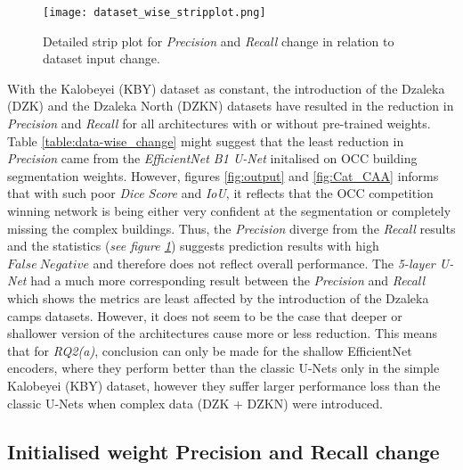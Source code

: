 \documentclass[11pt, a4paper, twoside]{report}
\begin{document}
\begin{figure}[H]
  \centering
  \texttt{[image: dataset\_wise\_stripplot.png]}
  \caption{Detailed strip plot for \textit{Precision} and \textit{Recall} change in relation to dataset input change.}
  \label{fig:data_stripplot}
\end{figure}


With the Kalobeyei (KBY) dataset as constant, the introduction of the Dzaleka (DZK) and the Dzaleka North (DZKN) datasets have resulted in the reduction in \textit{Precision} and \textit{Recall} for all architectures with or without pre-trained weights. Table \ref{table:data-wise_change} might suggest that the least reduction in \textit{Precision} came from the \textit{EfficientNet B1 U-Net} initalised on OCC building segmentation weights. However, figures \ref{fig:output} and \ref{fig:Cat_CAA} informs that with such poor \textit{Dice Score} and \textit{IoU}, it reflects that the OCC competition winning network is being either very confident at the segmentation or completely missing the complex buildings. Thus, the \textit{Precision} diverge from the \textit{Recall} results and the statistics (\textit{see figure \ref{fig:data_stripplot}}) suggests prediction results with high $False\ Negative$ and therefore does not reflect overall performance. The \textit{5-layer U-Net} had a much more corresponding result between the \textit{Precision} and \textit{Recall} which shows the metrics are least affected by the introduction of the Dzaleka camps datasets. However, it does not seem to be the case that deeper or shallower version of the architectures cause more or less reduction. This means that for \textit{RQ2(a)}, conclusion can only be made for the shallow EfficientNet encoders, where they perform better than the classic U-Nets only in the simple Kalobeyei (KBY) dataset, however they suffer larger performance loss than the classic U-Nets when complex data (DZK + DZKN) were introduced.\\\par

\subsection{Initialised weight Precision and Recall change}\label{weight_change}
\end{document}
